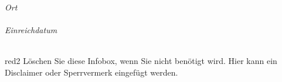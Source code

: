 \begin{titlepage}
\begin{center}
\vfill

{\large
\emph{Ort}\\
\tloc\\
\vspace{0.5cm}
\emph{Einreichdatum}\\
\tdate\\
\vspace{0.5cm}
}

\vfill
\begin{textbox}{red}{2}
    Löschen Sie diese Infobox, wenn Sie nicht benötigt wird. Hier kann ein Disclaimer oder Sperrvermerk eingefügt werden.
\end{textbox}

\vfill
\end{center}
\end{titlepage}
\restoregeometry